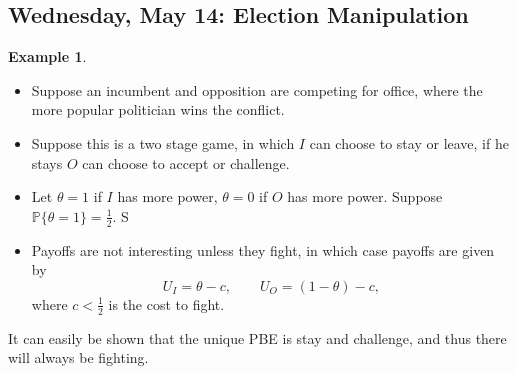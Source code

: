 \documentclass[10pt, oneside]{article}
\newcommand{\bbP}{\mathbb{P}}
\theoremstyle{definition}
\newtheorem{exmp}{Example}[section]
\begin{document}
\newpage
\subsection{Wednesday, May 14: Election Manipulation}
\begin{exmp}
    \begin{itemize}
        \item Suppose an incumbent and opposition are competing for office, where the more popular politician wins the conflict. 
        \item Suppose this is a two stage game, in which $I$ can choose to stay or leave, if he stays $O$ can choose to accept or challenge.
        \item Let $\theta = 1$ if $I$ has more power, $\theta = 0$ if $O$ has more power. Suppose $\bbP\{\theta = 1\} = \frac{1}{2}.$ S 
        \item Payoffs are not interesting unless they fight, in which case payoffs are given by
        \[U_I = \theta - c, \qquad U_O = (1 - \theta) - c,\] where $c< \frac{1}{2}$ is the cost to fight.
    \end{itemize}
    It can easily be shown that the unique PBE is stay and challenge, and thus there will always be fighting.
\end{exmp}
\end{document}
